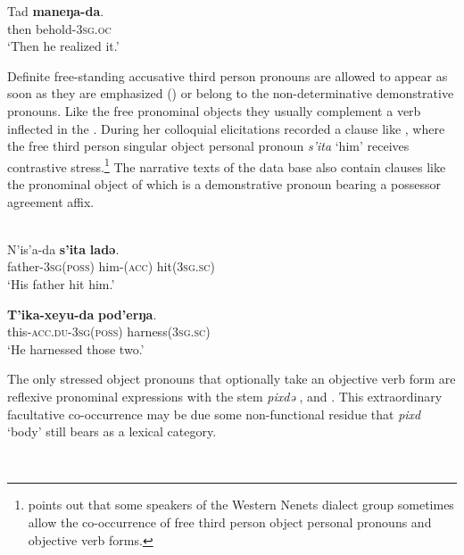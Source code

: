\documentclass[output=paper]{LSP/langsci}
\begin{document}

\ex\label{12-wr-ex:17b}
\gll  Tad \textbf{maneŋa-da}.\\
 then behold-\textsc{3sg.oc}\\
\glt ‘Then he realized it.’
\z
\z

Definite free-standing accusative third person pronouns are allowed to appear as soon as they are emphasized (\citealt[386--389]{Nikolaeva2014Grammar}) or belong to the non-determinative demonstrative pronouns. Like the  free  pronominal objects they usually complement a verb inflected in the . During her colloquial elicitations \citet[201--210]{Nikolaeva2014Grammar} recorded a clause like , where the free third person singular object personal pronoun \textit{s’ita} ‘him’ receives contrastive stress.\footnote{\citet[203]{Nikolaeva2014Grammar} points out that some speakers of the Western Nenets dialect group sometimes allow the co-occurrence of free third person object personal pronouns and objective verb forms.} The narrative texts of the  data base also contain clauses like  the pronominal object of which is a demonstrative pronoun bearing a possessor agreement affix. 

\ea \label{12-wr-ex:18}
\\
\ea\label{12-wr-ex:18a}
\gll  N’is’a-da \textbf{s’ita} \textbf{ladə}.\\
 father\textsc{-3sg(poss)} him-(\textsc{acc)} hit(\textsc{3sg.sc)}\\
\glt  ‘His father hit him.’ 

\ex \label{12-wr-ex:18b}
\gll \textbf{T’ika-xeyu-da} \textbf{pod’erŋa}.\\
 this-\textsc{acc.du-3sg(poss)} harness(\textsc{3sg.sc)}\\
\glt  ‘He harnessed those two.’
\z
\z

The only stressed object pronouns that optionally take an objective verb form are reflexive pronominal expressions with the stem \textit{pixdə} \citep[203]{Nikolaeva2014Grammar}, \cf {} and . This extraordinary facultative co-occurrence may be due some non-functional residue that  \textit{pixd} `body' still bears as a lexical category.

\ea \label{12-wr-ex:19} 
\\
\end{document}
